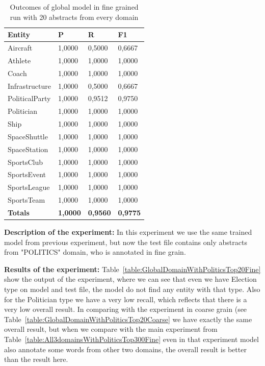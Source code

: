 \documentclass[thesis=M,english]{FITthesis}[2018/05/30]
\begin{document}
	\begin{table}[H]\centering
		\begin{tabular}{|l|l|l|l|}
			\hline {\textbf{Entity}} & {\textbf{P}} & {\textbf{R}} & {\textbf{F1}}\\\hline
				Aircraft & 1,0000 & 0,5000 & 0,6667\\
				Athlete & 1,0000 & 1,0000 & 1,0000\\
				Coach & 1,0000 & 1,0000 & 1,0000\\
				Infrastructure & 1,0000 & 0,5000 & 0,6667\\
				PoliticalParty & 1,0000 & 0,9512 & 0,9750\\
				Politician & 1,0000 & 1,0000 & 1,0000\\
				Ship & 1,0000 & 1,0000 & 1,0000\\
				SpaceShuttle & 1,0000 & 1,0000 & 1,0000\\
				SpaceStation & 1,0000 & 1,0000 & 1,0000\\ 
				SportsClub & 1,0000 & 1,0000 & 1,0000\\
				SportsEvent & 1,0000 & 1,0000 & 1,0000\\
				SportsLeague & 1,0000 & 1,0000 & 1,0000\\
				SportsTeam & 1,0000 & 1,0000 & 1,0000\\\hline
				\textbf{Totals} & \textbf{1,0000} & \textbf{0,9560} & \textbf{0,9775}\\\hline
		\end{tabular}
		\caption{Outcomes of global model in fine grained run with 20 abstracts from every domain \label{table:GlobalDomainWithAllAbstractsTop20Fine}}
	\end{table}

\textbf{Description of the experiment:} In this experiment we use the same trained model from previous experiment, but now the test file contains only abstracts from "POLITICS" domain, who is annotated in fine grain.

\textbf{Results of the experiment:} Table~\ref{table:GlobalDomainWithPoliticsTop20Fine} show the output of the experiment, where we can see that even we have Election type on model and test file, the model do not find any entity with that type. Also for the Politician type we have a very low recall, which reflects that there is a very low overall result. In comparing with the experiment in coarse grain (see Table~\ref{table:GlobalDomainWithPoliticsTop20Coarse} we have exactly the same overall result, but when we compare with the main experiment from Table~\ref{table:All3domainsWithPoliticsTop300Fine} even in that experiment model also annotate some words from other two domains, the overall result is better than the result here.
\end{document}
